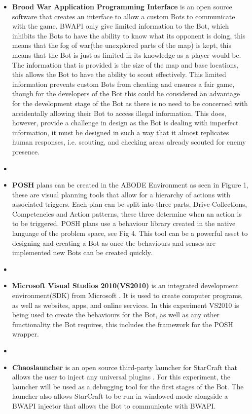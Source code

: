 \documentclass[journal]{IEEEtran}
\begin{document}
	\begin{itemize}
		\item \textbf{Brood War Application Programming Interface} \cite{BWAPI} is an open source software that creates an interface to allow a custom Bots to communicate with the game. BWAPI only give limited information to the Bot, which inhibits the Bots to have the ability to know what its opponent is doing, this means that the fog of war(the unexplored parts of the map) is kept\cite{POSH}, this means that the Bot is just as limited in its knowledge as a player would be. The information that is provided is the size of the map and base locations, this allows the Bot to have the ability to scout effectively. This limited information prevents custom Bots from cheating and ensures a fair game, though for the developers of the Bot this could be considered an advantage for the development stage of the Bot as there is no need to be concerned with accidentally allowing their Bot to access illegal information. This does, however, provide a challenge in design as the Bot is dealing with imperfect information, it must be designed in such a way that it almost replicates human responses, i.e. scouting, and checking areas already scouted for enemy presence.
		\item[]
		\item \textbf{POSH} plans can be created in the ABODE Environment as seen in Figure 1, these are visual planning tools that allow for a hierarchy of actions with associated triggers. Each plan can be split into three parts, Drive-Collections, Competencies and Action patterns, these three determine when an action is to be triggered. POSH plans use a behaviour library created in the native language of the problem space, see Fig 4. This tool can be a powerful asset to designing and creating a Bot as once the behaviours and senses are implemented new Bots can be created quickly.
		\item[]
		\item \textbf{Microsoft Visual Studios 2010(VS2010)} is an integrated development environment(SDK) from Microsoft \cite{Visual}. It is used to create computer programs, as well as websites, apps, and online services. In this experiment VS2010 is being used to create the behaviours for the Bot, as well as any other functionality the Bot requires, this includes the framework for the POSH wrapper.
		\item[]
		\item \textbf{Chaoslauncher} is an open source third-party launcher for StarCraft that allows the user to inject any universal plugins \cite{Chaos}. For this experiment, the launcher will be used as a debugging tool for the first stages of the Bot. The launcher also allows StarCraft to be run in windowed mode alongside a BWAPI injector that allows the Bot to communicate with BWAPI.    

\end{itemize}
\end{document}
